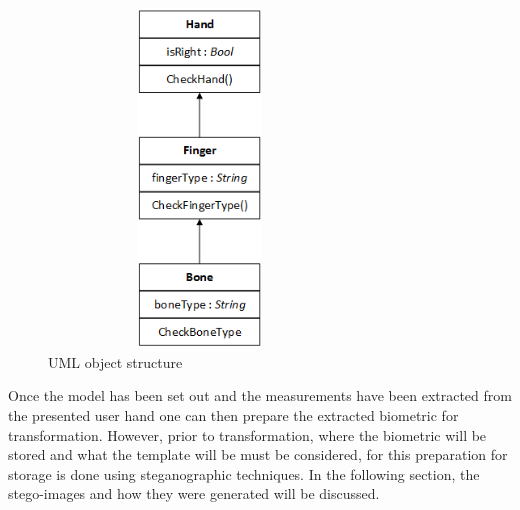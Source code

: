     
    \begin{figure}[htbp!] 
    \centering    
    \includegraphics[width=8cm,height=9cm,keepaspectratio]{Chapter3/Figs/Object_Diagram.png}
    \caption[UML object structure]{UML object structure}
    \label{fig:UML object structure}
    \end{figure}

Once the model has been set out and the measurements have been extracted from the presented user hand one can then prepare the extracted biometric for transformation. However, prior to transformation, where the biometric will be stored and what the template will be must be considered, for this preparation for storage is done using steganographic techniques. In the following section, the stego-images and how they were generated will be discussed.






